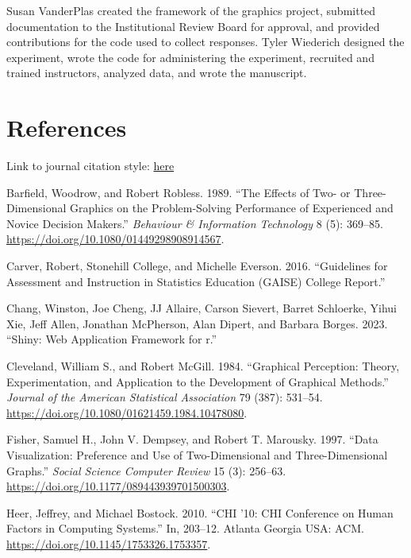 \documentclass[
  12pt,
]{article}
\newlength{\cslhangindent}
\newenvironment{CSLReferences}[2] %
 {\begin{list}{}{%
  \setlength{\itemindent}{0pt}
  \setlength{\leftmargin}{0pt}
  \setlength{\parsep}{0pt}
  \ifodd #1
   \setlength{\leftmargin}{\cslhangindent}
   \setlength{\itemindent}{-1\cslhangindent}
  \fi
  \setlength{\itemsep}{#2\baselineskip}}}
 {\end{list}}
\begin{document}
Susan VanderPlas created the framework of the graphics project,
submitted documentation to the Institutional Review Board for approval,
and provided contributions for the code used to collect responses. Tyler
Wiederich designed the experiment, wrote the code for administering the
experiment, recruited and trained instructors, analyzed data, and wrote
the manuscript.

\section{References}\label{references}

Link to journal citation style:
\href{https://www.tandfonline.com/action/authorSubmission?show=instructions&journalCode=ujse21\#refs}{here}

\label{refs}
\begin{CSLReferences}{1}{0}
Barfield, Woodrow, and Robert Robless. 1989. {``The Effects of Two- or
Three-Dimensional Graphics on the Problem-Solving Performance of
Experienced and Novice Decision Makers.''} \emph{Behaviour \&
Information Technology} 8 (5): 369--85.
\url{https://doi.org/10.1080/01449298908914567}.

Carver, Robert, Stonehill College, and Michelle Everson. 2016.
{``Guidelines for Assessment and Instruction in Statistics Education
(GAISE) College Report.''}

Chang, Winston, Joe Cheng, JJ Allaire, Carson Sievert, Barret Schloerke,
Yihui Xie, Jeff Allen, Jonathan McPherson, Alan Dipert, and Barbara
Borges. 2023. {``Shiny: Web Application Framework for r.''}

Cleveland, William S., and Robert McGill. 1984. {``Graphical Perception:
Theory, Experimentation, and Application to the Development of Graphical
Methods.''} \emph{Journal of the American Statistical Association} 79
(387): 531--54. \url{https://doi.org/10.1080/01621459.1984.10478080}.

Fisher, Samuel H., John V. Dempsey, and Robert T. Marousky. 1997.
{``Data Visualization: Preference and Use of Two-Dimensional and
Three-Dimensional Graphs.''} \emph{Social Science Computer Review} 15
(3): 256--63. \url{https://doi.org/10.1177/089443939701500303}.

Heer, Jeffrey, and Michael Bostock. 2010. {``CHI '10: CHI Conference on
Human Factors in Computing Systems.''} In, 203--12. Atlanta Georgia USA:
ACM. \url{https://doi.org/10.1145/1753326.1753357}.


\end{CSLReferences}
\end{document}
